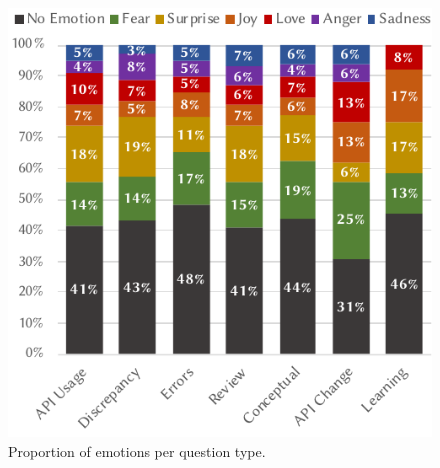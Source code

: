 \begin{figure}[th]
\centering
\includegraphics[width=.6\linewidth]{emotionproportion}
\caption{Proportion of emotions per question type.}
\label{semotion2021:fig:emotion-dist}
\end{figure}

